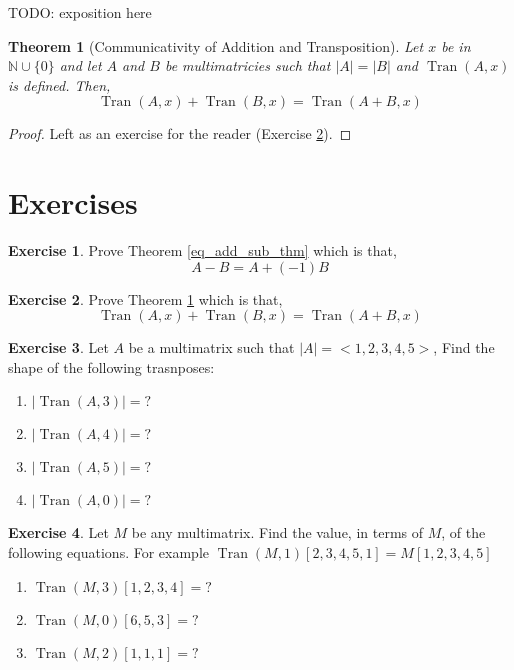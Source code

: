 \documentclass[12pt]{book}
\theoremstyle{plain}
\newtheorem{theorem}{Theorem}[chapter]
\theoremstyle{definition}
\newtheorem{exercise}{Exercise}[chapter]
\theoremstyle{ppart}
\theoremstyle{case}
\theoremstyle{solution}
\DeclareMathOperator{\Tran}{Tran}
\newcommand{\shape}[1]{\left|#1\right|}
\begin{document}
TODO: exposition here

\begin{theorem}[Communicativity of Addition and Transposition]
\label{com_add_tran_thm}
Let $x$ be in $\mathbb{N} \cup \{0\}$ and let $A$ and $B$ be
multimatricies such that $\shape{A} = \shape{B}$ and $\Tran(A, x)$ is defined.
Then,
\[ \Tran(A, x) + \Tran(B, x) = \Tran(A+B, x) \]
\end{theorem}
\begin{proof}
Left as an exercise for the reader (Exercise \ref{com_add_tran_ex}).
\end{proof}

\section{Exercises}

\begin{exercise}
\label{eq_add_sub_ex}
Prove Theorem \ref{eq_add_sub_thm} which is that,
\[ A - B = A + (-1)B \]
\end{exercise}

\begin{exercise}
\label{com_add_tran_ex}
Prove Theorem \ref{com_add_tran_thm} which is that,
\[ \Tran(A, x) + \Tran(B, x) = \Tran(A+B, x) \]
\end{exercise}

\begin{exercise}
Let $A$ be a multimatrix such that $\shape{A} = <1,2,3,4,5>$,
Find the shape of the following trasnposes:
\begin{enumerate}
\item $\shape{\Tran(A, 3)} = ?$
\item $\shape{\Tran(A, 4)} = ?$
\item $\shape{\Tran(A, 5)} = ?$
\item $\shape{\Tran(A, 0)} = ?$
\end{enumerate}
\end{exercise}

\begin{exercise}
Let $M$ be any multimatrix.
Find the value, in terms of $M$, of the following equations.
For example $\Tran(M, 1)[2,3,4,5,1] = M[1,2,3,4,5]$
\begin{enumerate}
\item $\Tran(M, 3)[1,2,3,4] = ?$
\item $\Tran(M, 0)[6,5,3] = ?$
\item $\Tran(M, 2)[1,1,1] = ?$
\end{enumerate}
\end{exercise}
\end{document}
